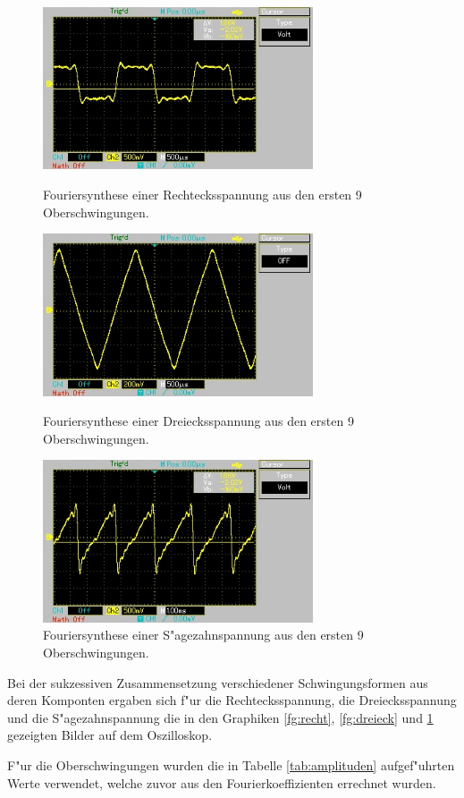 \begin{figure}[!h]
	\centering
	\includegraphics[width = 8cm]{img/rechteck.jpg}
	\caption{Fouriersynthese einer Rechtecksspannung aus den ersten 9 Oberschwingungen.}
	\label{fg:recht}

	\includegraphics[width = 8cm]{img/dreieck.jpg}
	\caption{Fouriersynthese einer Dreiecksspannung aus den ersten 9 Oberschwingungen.}
	\label{fg:dreieck}

	\includegraphics[width = 8cm]{img/saege.jpg}
	\caption{Fouriersynthese einer S"agezahnspannung aus den ersten 9 Oberschwingungen.}
	\label{fg:saege}
\end{figure}



Bei der sukzessiven Zusammensetzung verschiedener Schwingungsformen aus deren Komponten ergaben sich f"ur die Rechtecksspannung, die Dreiecksspannung und die S"agezahnspannung die in den Graphiken \ref{fg:recht}, \ref{fg:dreieck} und \ref{fg:saege} gezeigten Bilder auf dem Oszilloskop.

F"ur die Oberschwingungen wurden die in Tabelle \ref{tab:amplituden} aufgef"uhrten Werte verwendet, welche zuvor aus den Fourierkoeffizienten errechnet wurden.